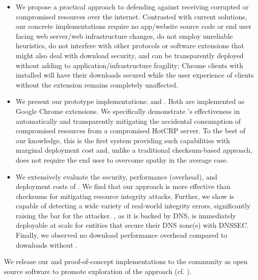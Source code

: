 \begin{itemize}

  \item We propose a practical approach to defending against receiving corrupted
  or compromised resources over the internet. Contrasted with current solutions,
  our concrete implementations require no app/website source code or end user
  facing web server/web infrastructure changes, do not employ unreliable
  heuristics, do not interfere with other protocols or software extensions that
  might also deal with download security, and can be transparently deployed
  without adding to application/infrastructure fragility; \eg Chrome clients
  with \DNSSYS{} installed will have their downloads secured while the user
  experience of clients without the extension remains completely unaffected.

  \item We present our prototype \SYSTEM{} implementations: \DNSSYS{} and
  \DHTSYS{}. Both are implemented as Google Chrome extensions. We specifically
  demonstrate \DNSSYS{}'s effectiveness in automatically and transparently
  mitigating the accidental consumption of compromised resources from a
  compromised HotCRP server. To the best of our knowledge, this is the
  first system providing such capabilities with marginal deployment cost
  and, unlike a traditional checksum-based approach, does not require the end
  user to overcome apathy in the average case.

  \item We extensively evaluate the security, performance (overhead), and
  deployment costs of \DNSSYS{}. We find that our approach is more effective
  than checksums for mitigating resource integrity attacks. Further, we show
  \DNSSYS{} is capable of detecting a wide variety of real-world integrity
  errors, significantly raising the bar for the attacker. \DNSSYS{}, as it is
  backed by DNS, is immediately deployable at scale for entities that secure
  their DNS zone(s) with DNSSEC. Finally, we observed no download performance
  overhead compared to downloads without \DNSSYS{}.

\end{itemize}

We release our \DNSSYS{} and \DHTSYS{} proof-of-concept implementations to the
community as open source software to promote exploration of the \SYSTEM{}
approach (cf. ).
